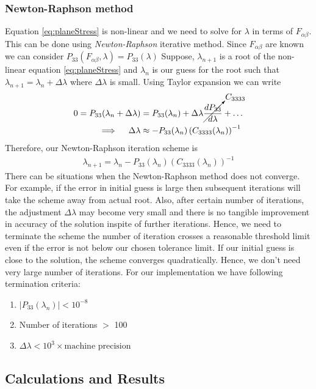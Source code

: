 \documentclass[../main.tex]{subfiles}
\begin{document}
\subsubsection{Newton-Raphson method}
\label{sec:NR}
Equation \ref{eq:planeStress} is non-linear and we need to solve for
$\lambda$ in terms of $F_{\alpha\beta}$. This can be done using
\textit{Newton-Raphson} iterative method. Since $F_{\alpha\beta}$ are
known we can consider
$P_{33}(F_{\alpha\beta},\lambda) = P_{33}(\lambda)$ Suppose,
$\lambda_{n+1}$ is a root of the non-linear equation
\ref{eq:planeStress} and $\lambda_{n}$ is our guess for the root such
that $\lambda_{n+1}=\lambda_{n}+\Delta\lambda$ where $\Delta\lambda$
is small. Using Taylor expansion we can write
\begin{align*}
  0 = P_{33}(\lambda_n+\Delta\lambda) &=P_{33}(\lambda_n) + \Delta\lambda\cancelto{C_{3333}}{\frac{dP_{33}}{d\lambda}} + \ldots\\
  \implies \quad \Delta\lambda &\approx -P_{33}(\lambda_n)\left(C_{3333}(\lambda_n)\right)^{-1}
\end{align*}
Therefore, our Newton-Raphson iteration scheme is
\begin{align}
  \boxed{\lambda_{n+1} = \lambda_n- P_{33}(\lambda_n)\left(C_{3333}(\lambda_n)\right)^{-1}}
\end{align}
There can be situations when the Newton-Raphson method does not
converge. For example, if the error in initial guess is large then
subsequent iterations will take the scheme away from actual
root. Also, after certain number of iterations, the adjustment
$\Delta\lambda$ may become very small and there is no tangible
improvement in accuracy of the solution inspite of further
iterations. Hence, we need to terminate the scheme the number of
iteration crosses a reasonable threshold limit even if the error is
not below our chosen tolerance limit. If our initial guess is close to
the solution, the scheme converges quadratically. Hence, we don't need
very large number of iterations. For our implementation we have
following termination criteria:
\begin{enumerate}
\item $|P_{33}(\lambda_n)| < 10^{-8}$
\item Number of iterations $>$ 100
\item $\Delta\lambda < 10^3\times \text{machine precision}$
\end{enumerate}


\subsection{Calculations and Results}
\label{sec:calc}
\lstset{ basicstyle=\ttfamily, columns=fixed }
\end{document}
